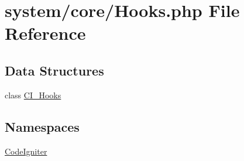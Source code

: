 \hypertarget{system_2core_2hooks_8php}{\section{system/core/\-Hooks.php File Reference}
\label{system_2core_2hooks_8php}
}
\subsection*{Data Structures}
\begin{DoxyCompactItemize}
\item 
class \hyperlink{class_c_i___hooks}{C\-I\-\_\-\-Hooks}
\end{DoxyCompactItemize}
\subsection*{Namespaces}
\begin{DoxyCompactItemize}
\item 
\hyperlink{namespace_code_igniter}{Code\-Igniter}
\end{DoxyCompactItemize}

